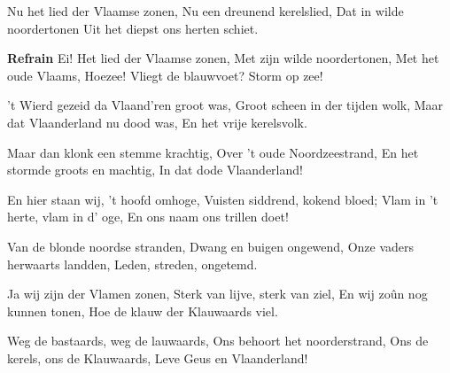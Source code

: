 \footnotemark [
ititle={Blauwvoet, De}]


\beginverse
Nu het lied der Vlaamse zonen,
Nu een dreunend kerelslied,
Dat in wilde noordertonen
Uit het diepst ons herten schiet.
\endverse

\beginchorus
\textbf{Refrain}
Ei! Het lied der Vlaamse zonen,
Met zijn wilde noordertonen,
Met het oude Vlaams, Hoezee!
Vliegt de blauwvoet? Storm op zee!
\endchorus

\beginverse
't Wierd gezeid da Vlaand'ren groot was,
Groot scheen in der tijden wolk,
Maar dat Vlaanderland nu dood was,
En het vrije kerelsvolk.
\endverse

\beginverse
Maar dan klonk een stemme krachtig,
Over 't oude Noordzeestrand,
En het stormde groots en machtig,
In dat dode Vlaanderland!
\endverse

\beginverse
En hier staan wij, 't hoofd omhoge,
Vuisten siddrend, kokend bloed;
Vlam in 't herte, vlam in d' oge,
En ons naam ons trillen doet!
\endverse

\beginverse
Van de blonde noordse stranden,
Dwang en buigen ongewend,
Onze vaders herwaarts landden,
Leden, streden, ongetemd.
\endverse

\beginverse
Ja wij zijn der Vlamen zonen,
Sterk van lijve, sterk van ziel,
En wij zoûn nog kunnen tonen,
Hoe de klauw der Klauwaards viel.
\endverse

\beginverse
Weg de bastaards, weg de lauwaards,
Ons behoort het noorderstrand,
Ons de kerels, ons de Klauwaards,
Leve Geus en Vlaanderland!
\endverse
\endsong